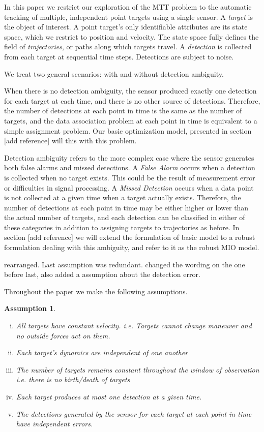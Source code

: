 \documentclass[journal]{IEEEtran}
\newtheorem{assumption}{Assumption}
\begin{document}
In this paper we restrict our exploration of the MTT problem to the automatic tracking of multiple, independent point targets using a single sensor. A \textit{target} is the object of interest. A point target's only identifiable attributes are its state space, which we restrict to position and velocity. The state space fully defines the field of \textit{trajectories}, or paths along which targets travel. A \textit{detection} is collected from each target at sequential time steps. Detections are subject to noise. {\color{red} We treat two general scenarios: with and without detection ambiguity. 

When there is no detection ambiguity, the sensor produced exactly one detection for each target at each time, and there is no other source of detections. Therefore, the number of detections at each point in time is the same as the number of targets, and the data association problem at each point in time is equivalent to a simple assignment problem. Our basic optimization model, presented in section [add reference] will this with this problem. 

Detection ambiguity refers to the more complex case where the sensor generates both false alarms and missed detections. A \textit{False Alarm} occurs when a detection is collected when no target exists. This could be the result of measurement error or difficulties in signal processing. A \textit{Missed Detection} occurs when a data point is not collected at a given time when a target actually exists. Therefore, the number of detections at each point in time may be either higher or lower than the actual number of targets, and each detection can be classified in either of these categories in addition to assigning targets to trajectories as before. In section [add reference] we will extend the formulation of basic model to a robust formulation dealing with this ambiguity, and refer to it as the robust MIO model.}

{\color{red} rearranged. Last assumption was redundant. changed the wording on the one before last, also added a assumption about the detection error.}

Throughout the paper we make the following assumptions.
\begin{assumption}\label{ass:general_assumption}
\begin{enumerate}[(i)]
\item{}All targets have constant velocity. \textit{i.e.} Targets cannot change maneuver and no outside forces act on them.
\item Each target's dynamics are independent of one another
\item{}The number of targets remains constant throughout the window of observation \textit{i.e.} there is no birth/death of targets
\item Each target produces at most one detection at a given time. 
\item The detections generated by the sensor for each target at each point in time have independent errors. 
\end{enumerate}
\end{assumption}
\end{document}
